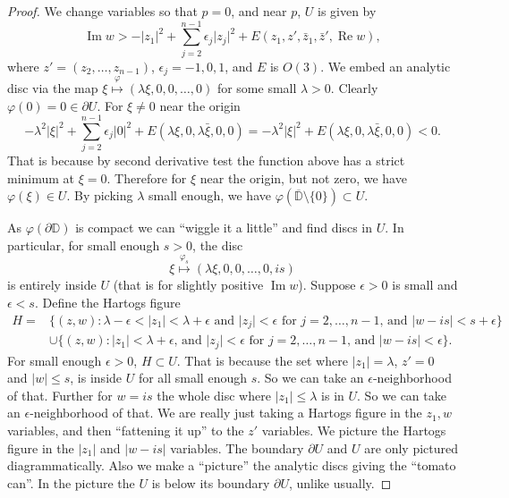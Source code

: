 \documentclass[12pt,openany]{book}
\renewcommand{\Re}{\operatorname{Re}}
\renewcommand{\Im}{\operatorname{Im}}
\newcommand{\sabs}[1]{\lvert {#1} \rvert}
\newcommand{\D}{{\mathbb{D}}}
\theoremstyle{plain}
\theoremstyle{remark}
\theoremstyle{definition}
\theoremstyle{exercise}
\theoremstyle{example}
\begin{document}
\begin{proof}
We change variables so that $p = 0$, and
near $p$, $U$ is given by
\begin{equation*}
\Im w > -\sabs{z_1}^2 + \sum_{j=2}^{n-1} \epsilon_j \sabs{z_j}^2 +
E(z_1,z',\bar{z}_1,\bar{z}',\Re w) ,
\end{equation*}
where $z' = (z_2,\ldots,z_{n-1})$, $\epsilon_j = -1,0,1$, and $E$ is $O(3)$.
We embed an analytic disc via the map
$\xi \overset{\varphi}{\mapsto} (\lambda \xi, 0, 0, \ldots, 0)$ for some small $\lambda > 0$.
%
Clearly $\varphi(0) = 0 \in \partial U$.  For $\xi \not= 0$ near the origin
\begin{equation*}
-\lambda^2 \sabs{\xi}^2 + \sum_{j=2}^{n-1} \epsilon_j \sabs{0}^2 + E(\lambda
\xi,0,\lambda \bar{\xi},0,0)
=
-\lambda^2 \sabs{\xi}^2 + E(\lambda
\xi,0,\lambda \bar{\xi},0,0)
< 0 .
\end{equation*}
That is because by second derivative test the function above has a strict minimum
at $\xi = 0$.  Therefore for $\xi$ near the origin, but not zero, we have 
$\varphi(\xi) \in U$.  By picking $\lambda$ small enough, we have
$\varphi(\overline{\D}\setminus\{0\}) \subset U$.

As $\varphi(\partial \D)$ is compact we can ``wiggle it a little'' and
find discs in $U$.  In particular, for small enough $s > 0$, the disc
\begin{equation*}
\xi \overset{\varphi_s}{\mapsto} (\lambda \xi, 0, 0, \ldots, 0, i s) 
\end{equation*}
is entirely inside $U$ (that is for slightly positive $\Im w$).
Suppose $\epsilon > 0$ is small and $\epsilon < s$.
Define the Hartogs figure
\begin{equation*}
\begin{split}
H =
& \bigl\{ (z,w) : \lambda - \epsilon < \sabs{z_1} < \lambda + \epsilon
\text{ and }
\sabs{z_j} < \epsilon \text{ for $j=2,\ldots,n-1$, and }
\sabs{w-is} < s+\epsilon \bigr\} 
\\
&
\cup 
\bigl\{ (z,w) : \sabs{z_1} < \lambda + \epsilon \text{, and } \sabs{z_j} < \epsilon \text{ for $j=2,\ldots,n-1$, and }
\sabs{w-is} < \epsilon \bigr\} .
\end{split}
\end{equation*}
For small enough $\epsilon >0$, $H \subset U$.
That is because the set where $\sabs{z_1} = \lambda$, $z' = 0$
and $\sabs{w} \leq s$, is inside $U$ for all small enough $s$.  So we can
take an $\epsilon$-neighborhood of that.
Further for
$w = is$ the whole disc where $\sabs{z_1} \leq \lambda$ is in $U$.
So we can take an $\epsilon$-neighborhood of that.
We are really just taking a Hartogs figure in the $z_1,w$ variables, and then
``fattening it up'' to the $z'$ variables.
We picture the Hartogs figure in the $\sabs{z_1}$ and $\sabs{w-is}$
variables.  The boundary $\partial U$ and $U$ are only pictured diagrammatically.
Also we make a ``picture'' the analytic discs giving the ``tomato can''.
In the picture the $U$ is below its boundary $\partial U$, unlike usually.


\end{proof}
\end{document}
